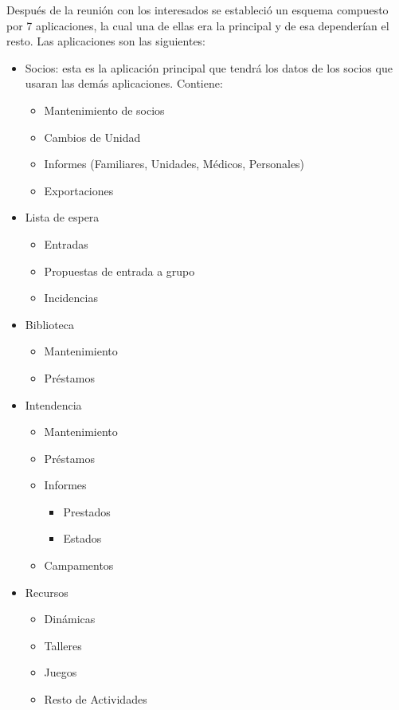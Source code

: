 Después de la reunión con los interesados se estableció un esquema compuesto por 7 aplicaciones,
la cual una de ellas era la principal y de esa dependerían el resto. Las aplicaciones son las siguientes:
\begin{itemize}
\item Socios: esta es la aplicación principal que tendrá los datos de los socios que usaran las demás aplicaciones. Contiene:
	\begin{itemize}
	\item Mantenimiento de socios
	\item Cambios de Unidad
	\item Informes (Familiares, Unidades, Médicos, Personales)
	\item Exportaciones
	\end{itemize}

\item Lista de espera
	\begin{itemize}
	\item Entradas
	\item Propuestas de entrada a grupo
	\item Incidencias
	\end{itemize}

\item Biblioteca
	\begin{itemize}
	\item Mantenimiento
	\item Préstamos
	\end{itemize}

\item Intendencia
	\begin{itemize}
	\item Mantenimiento
	\item Préstamos
	\item Informes
		\begin{itemize}
		\item Prestados
		\item Estados
		\end{itemize}
	\item Campamentos
	\end{itemize}
\item Recursos
	\begin{itemize}
	\item Dinámicas
	\item Talleres
	\item Juegos
	\item Resto de Actividades
	\end{itemize}


\end{itemize}
